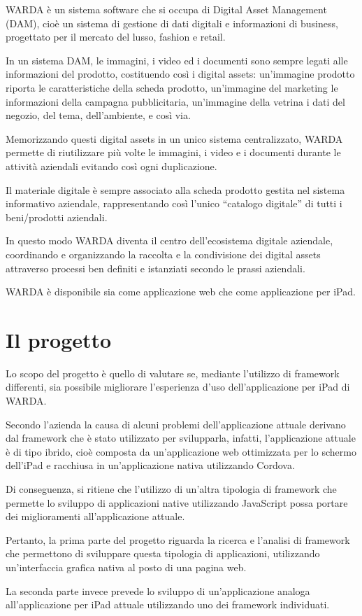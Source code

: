 WARDA è un sistema software che si occupa di Digital Asset Management (DAM), cioè un sistema di gestione di dati digitali e informazioni di business, progettato per il mercato del lusso, fashion e retail. 

In un sistema DAM, le immagini, i video ed i documenti sono sempre legati alle informazioni del prodotto, costituendo così i digital assets: un'immagine prodotto riporta le caratteristiche della scheda prodotto, un'immagine del marketing le informazioni della campagna pubblicitaria, un'immagine della vetrina i dati del negozio, del tema, dell'ambiente, e così via.

Memorizzando questi digital assets in un unico sistema centralizzato, WARDA permette di riutilizzare più volte le immagini, i video e i documenti durante le attività aziendali evitando così ogni duplicazione. 

Il materiale digitale è sempre associato alla scheda prodotto gestita nel sistema informativo aziendale, rappresentando così l'unico ``catalogo digitale'' di tutti i beni/prodotti aziendali.

In questo modo WARDA diventa il centro dell'ecosistema digitale aziendale, coordinando e organizzando la raccolta e la condivisione dei digital assets attraverso processi ben definiti e istanziati secondo le prassi aziendali.

WARDA è disponibile sia come applicazione web che come applicazione per iPad.

\section{Il progetto}
Lo scopo del progetto è quello di valutare se, mediante l'utilizzo di framework differenti, sia possibile migliorare l'esperienza d'uso dell'applicazione per iPad di WARDA.

Secondo l'azienda la causa di alcuni problemi dell'applicazione attuale derivano dal framework che è stato utilizzato per svilupparla, infatti, l'applicazione attuale è di tipo ibrido, cioè composta da un'applicazione web ottimizzata per lo schermo dell'iPad e racchiusa in un'applicazione nativa utilizzando \gls{Cordova}.

Di conseguenza, si ritiene che l'utilizzo di un'altra tipologia di framework che permette lo sviluppo di applicazioni native utilizzando JavaScript possa portare dei miglioramenti all'applicazione attuale.

Pertanto, la prima parte del progetto riguarda la ricerca e l'analisi di framework che permettono di sviluppare questa tipologia di applicazioni, utilizzando un'interfaccia grafica nativa al posto di una pagina web.

La seconda parte invece prevede lo sviluppo di un'applicazione analoga all'applicazione per iPad attuale utilizzando uno dei framework individuati.

